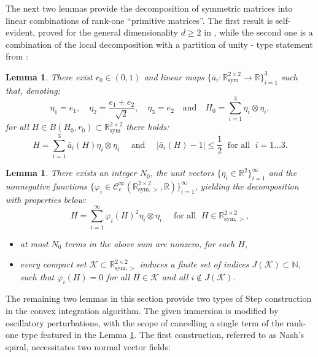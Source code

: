 \documentclass[reqno,twoside,11pt]{amsart}
\newcommand{\sym}{\mathrm{sym}}
\newcommand{\R}{\mathbb{R}}
\numberwithin{equation}{section}
\theoremstyle{plain}
\newtheorem{lemma}[theorem]{Lemma}
\theoremstyle{definition}
\begin{document}
\medskip

The next two lemmas provide the decomposition of symmetric
matrices into linear combinations of rank-one ``primitive matrices''.
The first result is self-evident, proved for the general dimensionality $d\geq 2$ in
\cite[Lemma 5.2]{CDS}, while the second one is a combination of the
local decomposition with a partition of unity - type statement from \cite[Lemma 3.3]{Laszlo}:

\begin{lemma}\label{lem_dec_def}
There exist $r_0\in (0,1)$ and linear maps $\{\bar a_i:\R^{2\times
  2}_{\sym}\to\R\}_{i=1}^{3}$ such that, denoting:
$$ \eta_1 = e_1,\quad \eta_2 = \frac{e_1+e_2}{\sqrt{2}},\quad \eta_3=
e_2 \quad \mbox{and} \quad H_0=\sum_{i=1}^3 \eta_i \otimes \eta_i, $$
for all $H\in B(H_0,r_0)\subset \R^{2\times 2}_{\sym}$ there holds:
$$H = \sum_{i=1}^{3} \bar a_i(H) \eta_i\otimes\eta_i \quad \mbox{ and } \quad
|\bar a_i (H)-1|\leq\frac{1}{2} \; \mbox{ for all }\;  i =1\ldots 3.$$
\end{lemma}

\begin{lemma}\label{lem_met_deco}
There exists an integer $N_0$, the unit vectors $\{\eta_i\in\R^2\}_{i=1}^\infty$ 
and the nonnegative functions
$\{\varphi_i\in\mathcal{C}^\infty_c(\R^{2\times 2}_{\sym,
  >},\R)\}_{i=1}^\infty$, yielding the decomposition with properties below:
$$ H = \sum_{i=1}^{\infty} \varphi_i(H)^2 \eta_i\otimes\eta_i \quad
\mbox{ for all } \; H\in \R^{2\times 2}_{\sym, >},$$
\begin{itemize} 
\item[(i)] at most $N_0$ terms in the above sum are nonzero, for each $H$,
\item[(ii)] every compact set $\mathcal{K}\subset  \R^{2\times 2}_{\sym, >}$ 
induces a finite set of indices $J(\mathcal{K})\subset\mathbb{N}$, such that
$\varphi_i(H)=0$ for all $H\in \mathcal{K}$ and all $i\not\in J(\mathcal{K})$.
\end{itemize}
\end{lemma}

\medskip

The remaining two lemmas in this section provide two types of Step construction in the convex
integration algorithm. The given immersion is
modified by oscillatory perturbations, with the scope of
cancelling a single term of the rank-one type featured in the
Lemma \ref{lem_dec_def}. The first construction, referred to as Nash's spiral,
necessitates two normal vector fields:
\end{document}
